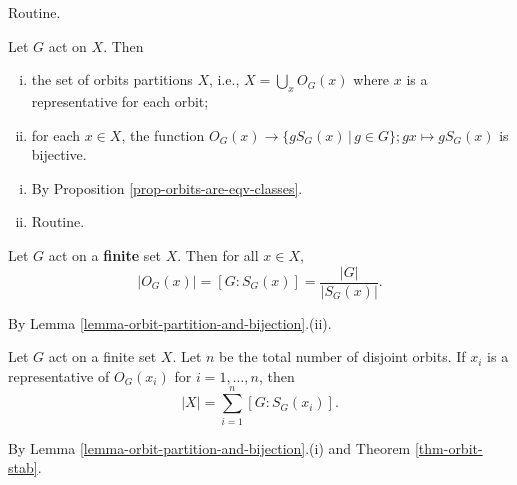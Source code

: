 \begin{remark}
\begin{proposition}
\begin{enumerate}[(i)]
\begin{equation*}
		\end{equation*}
	\end{enumerate}
\end{proposition}
\begin{sketch}
	Routine.
\end{sketch}
\begin{lemma} \label{lemma-orbit-partition-and-bijection}
	Let $G$  act on $X$. Then
	\begin{enumerate}[(i)]
		\item the set of orbits partitions $X$, i.e., $X = \bigcup_x O_G(x)$ where $x$ is a representative for each orbit;
		\item for each $x\in X$, the function $O_G(x) \rightarrow \{gS_G(x)\,|\, g\in G\}; gx\mapsto gS_G(x)$ is bijective.
	\end{enumerate}
\end{lemma}
\begin{sketch}
	\begin{enumerate}[(i)]
		\item By Proposition \ref{prop-orbits-are-eqv-classes}.
		\item Routine. \qedhere
	\end{enumerate}
\end{sketch}
\begin{theorem} \label{thm-orbit-stab}
	Let $G$ act on a \textbf{finite} set $X$. Then for all $x\in X$,
	\begin{equation*}
		|O_G(x)| = [G:S_G(x)] = \frac{|G|}{|S_G(x)|}.
	\end{equation*}
\end{theorem}
\begin{sketch}
	By Lemma \ref{lemma-orbit-partition-and-bijection}.(ii).
\end{sketch}
\begin{corollary} \label{cor-|X|=sum_[G:S_G(x_i)]}
	Let $G$ act on a finite set $X$. Let $n$ be the total number of disjoint orbits. If $x_i$ is a representative of $O_G(x_i)$ for $i=1,\dots, n$, then
	\begin{equation*}
		|X| = \sum_{i=1}^n [G:S_G(x_i)].
	\end{equation*}
\end{corollary}
\begin{sketch}
	By  Lemma \ref{lemma-orbit-partition-and-bijection}.(i) and Theorem \ref{thm-orbit-stab}.
\end{sketch}


\end{remark}
